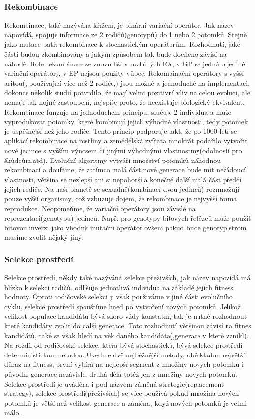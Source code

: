 \subsubsection{Rekombinace}
Rekombinace, také nazývána křížení, je binární variační operátor. Jak název napovídá, spojuje informace ze 2 rodičů(genotypů) do 1 nebo 2 potomků. Stejně jako mutace patří rekombinace k stochastickým operátorům. Rozhodnutí, jaké části budou zkombinovány a jakým způsobem tak bude docíleno závisí na náhodě. Role rekombinace se znovu liší v rozličných EA, v GP se jedná o jediné variační operátory, v EP nejsou použity vůbec. Rekombinační operátory s vyšší aritou(, používající více než 2 rodiče,) jsou možné a jednoduché na implementaci, dokonce několik studií potvrdilo, že mají velmi pozitivní vliv na celou evoluci, ale nemají tak hojné zastoupení, nejspíše proto, že neexistuje biologický ekvivalent. Rekombinace funguje na jednoduchém principu, slučuje 2 individua a může vyprodukovat potomky, které kombinují jejich výhodné vlastnosti, tedy potomek je úspěšnější než jeho rodiče. Tento princip podporuje fakt, že po 1000-letí se aplikací rekombinace na rostliny a zemědělská zvířata mnokrát podařilo vytvořit nové jedince s vyšším výnosem či jinými výhodnými vlastnostmy(odolnosti pro škůdcům,atd). Evoluční algoritmy vytváří množství potomků náhodnou rekombinací a doufáme, že zatímco malá část nové generace bude mít nežádoucí vlastnosti, většina se nezlepší ani si nepohorší a konečně další malá část předčí jejich rodiče. Na naší planetě se sexuálně(kombinací dvou jedinců) rozmnožují pouze vyšší organismy, což vzbuzuje dojem, že rekombinace je nejvyšší forma reprodukce. Neopomeňme, že  variační operátory jsou závislé na reprezentaci(genotypu) jedinců. Např. pro genotypy bitových řetězců může použít bitovou inverzi jako vhodný mutační operátor ovšem pokud bude genotyp strom musíme zvolit nějaký jiný. 
\subsubsection{Selekce prostředí}
Selekce prostředí, někdy také nazýváná selekce přeživších, jak název napovídá má blízko k selekci rodičů, odlišuje jednotlivá individua na základě jejich fitness hodnoty. Oproti rodičovské selekci ji však použiváme v jiné části evolučního cyklu, selekce prostředí spouštíme hned po vytvoření nových potomků. Jelikož velikost populace kandidátů bývá skoro vždy konstatní, tak je nutné rozhodnout které kandidáty zvolit do další generace. Toto rozhodnutí většinou závisí na fitnes kandidátů, také se však hledí na věk daného kandidáta(,generace v které vznikl). Na rozdíl od rodičovské selekce, která bývá stochastická, bývá selekce prostředí deterministickou metodou. Uveďme dvě nejběžnější metody, obě kladou největší důraz na fitness, první vybírá na nejlepší segment z množiny nových potomků i původní generace nezávisle, druhá dělá totéž jen z množiny nových potomků. Selekce prostředí je uváděna i pod názvem záměná strategie(replacement strategy), selekce prostředí(přeživších) se více používá pokud množina nových potomků je větší než velikost generace a záměna, když nových potomků je velmi málo.
